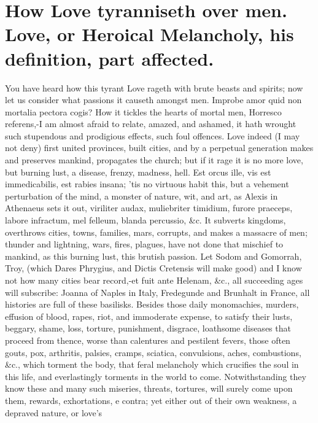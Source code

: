 {%
\section[How Love tyranniseth over men.]{How Love tyranniseth over men. Love, or Heroical Melancholy, his definition, part affected.}

You have heard how this tyrant Love rageth with brute beasts and
spirits; now let us consider what passions it causeth amongst men.
Improbe amor quid non mortalia pectora cogis? How it tickles the
hearts of mortal men, Horresco referens,-I am almost afraid to relate,
amazed, and ashamed, it hath wrought such stupendous and
prodigious effects, such foul offences. Love indeed (I may not deny)
first united provinces, built cities, and by a perpetual generation
makes and preserves mankind, propagates the church; but if it rage it
is no more love, but burning lust, a disease, frenzy, madness, hell.
Est orcus ille, vis est immedicabilis, est rabies insana; 'tis no
virtuous habit this, but a vehement perturbation of the mind, a monster
of nature, wit, and art, as Alexis in Athenaeus sets it out,
viriliter audax, muliebriter timidium, furore praeceps, labore
infractum, mel felleum, blanda percussio, \&c. It subverts kingdoms,
overthrows cities, towns, families, mars, corrupts, and makes a
massacre of men; thunder and lightning, wars, fires, plagues, have not
done that mischief to mankind, as this burning lust, this brutish
passion. Let Sodom and Gomorrah, Troy, (which Dares Phrygius, and
Dictis Cretensis will make good) and I know not how many cities bear
record,-et fuit ante Helenam, \&c., all succeeding ages will subscribe:
Joanna of Naples in Italy, Fredegunde and Brunhalt in France, all
histories are full of these basilisks. Besides those daily monomachies,
murders, effusion of blood, rapes, riot, and immoderate expense, to
satisfy their lusts, beggary, shame, loss, torture, punishment,
disgrace, loathsome diseases that proceed from thence, worse than
calentures and pestilent fevers, those often gouts, pox, arthritis,
palsies, cramps, sciatica, convulsions, aches, combustions, \&c., which
torment the body, that feral melancholy which crucifies the soul in
this life, and everlastingly torments in the world to come.
Notwithstanding they know these and many such miseries, threats,
tortures, will surely come upon them, rewards, exhortations, e contra;
yet either out of their own weakness, a depraved nature, or love's
}
